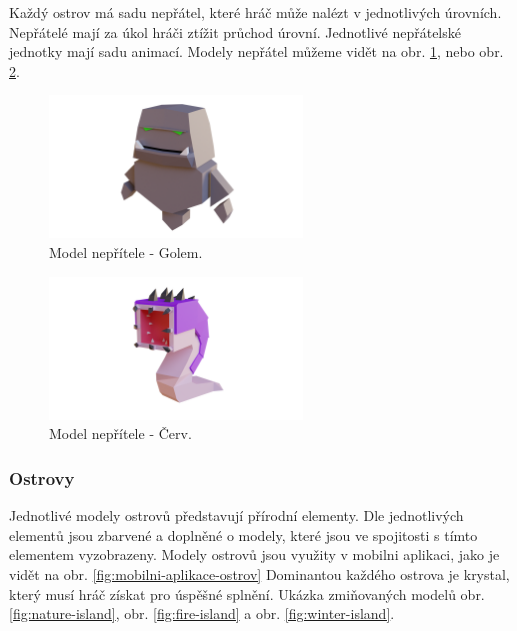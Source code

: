 Každý ostrov má sadu nepřátel, které hráč může nalézt v jednotlivých úrovních. Nepřátelé mají za úkol hráči ztížit průchod úrovní. Jednotlivé nepřátelské jednotky mají sadu animací. Modely nepřátel můžeme vidět na obr. \ref{fig:nepritel-golem}, nebo obr. \ref{fig:nepritel-cerv}.

\begin{figure}[h]
    \centering
    \includegraphics[width=0.6\textwidth]{img/nepritel-golem.png}
    \caption{Model nepřítele - Golem.}
    \label{fig:nepritel-golem}
\end{figure}

\begin{figure}[h]
    \centering
    \includegraphics[width=0.6\textwidth]{img/nepritel-cerv.png}
    \caption{Model nepřítele - Červ.}
    \label{fig:nepritel-cerv}
\end{figure}

\subsubsection{Ostrovy}
Jednotlivé modely ostrovů představují přírodní elementy. Dle jednotlivých elementů jsou zbarvené a doplněné o modely, které jsou ve spojitosti s tímto elementem vyzobrazeny. Modely ostrovů jsou využity v mobilni aplikaci, jako je vidět na obr. \ref{fig:mobilni-aplikace-ostrov} Dominantou každého ostrova je krystal, který musí hráč získat pro úspěšné splnění. Ukázka zmiňovaných modelů obr. \ref{fig:nature-island}, obr. \ref{fig:fire-island} a obr. \ref{fig:winter-island}.

